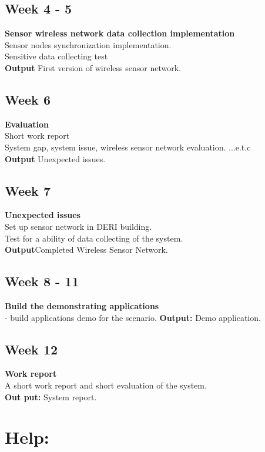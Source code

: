 \documentclass[a4paper]{llncs}
\newcommand{\head}[1]{\textnormal {\textbf{#1}}}
\begin{document}
\subsection{Week 4 - 5}
\head{Sensor wireless network data collection implementation}\\
Sensor nodes synchronization implementation.\\
Sensitive data collecting test\\
\head{Output} First version of wireless sensor network.
\subsection{Week 6}
\head{Evaluation}\\
Short work report\\
System gap, system issue, wireless sensor network evaluation. ...e.t.c\\
\head{Output} Unexpected issues.
\subsection{Week 7}
\head{Unexpected issues}\\
Set up sensor network in DERI building.\\
Test for a ability of data collecting of the system.\\
\head{Output}Completed Wireless Sensor Network.
\subsection{Week 8 - 11}
\head{Build the demonstrating applications}\\
- build applications demo for the scenario.
\head{Output: }  Demo application.
\subsection{Week 12}
\head{Work report}\\
A short work report and short evaluation of the system.\\
\head{Out put: } System report.

\section{Help:}
\end{document}

